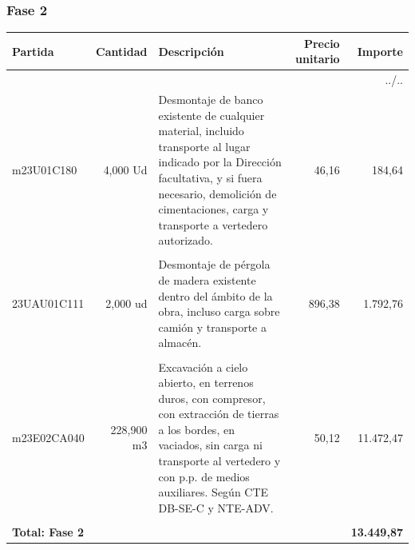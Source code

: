 \documentclass{book}%
\begin{document}
\subsubsection{Fase 2}%
\small%
\begin{longtable}{lrlrr}%
Partida&Cantidad&Descripción&\multicolumn{1}{p{1.5cm}}{Precio unitario}&Importe\\%
\hline%
\endhead%
\multicolumn{5}{r}{../..}\\%
\endfoot%
\hline%
\endlastfoot%
m23U01C180&     4,000 Ud&\multicolumn{1}{p{5cm}}{Desmontaje de banco existente de cualquier material, incluido transporte al lugar indicado por la Dirección facultativa, y si fuera necesario, demolición de cimentaciones, carga y transporte a vertedero autorizado.}&     46,16&184,64\\%
&&&&\\%
23UAU01C111&     2,000 ud&\multicolumn{1}{p{5cm}}{Desmontaje de pérgola de madera existente dentro del ámbito de la obra, incluso carga sobre camión y transporte a almacén.}&    896,38&1.792,76\\%
&&&&\\%
m23E02CA040&   228,900 m3&\multicolumn{1}{p{5cm}}{Excavación a cielo abierto, en terrenos duros, con compresor, con extracción de tierras a los bordes, en vaciados, sin carga ni transporte al vertedero y con p.p. de medios auxiliares. Según CTE DB{-}SE{-}C y NTE{-}ADV.}&     50,12&11.472,47\\%
&&&&\\%
\multicolumn{4}{p{8cm}}{\textbf{Total: Fase 2}}&\textbf{13.449,87}\\%
\end{longtable}%
\normalsize

%
\end{document}
